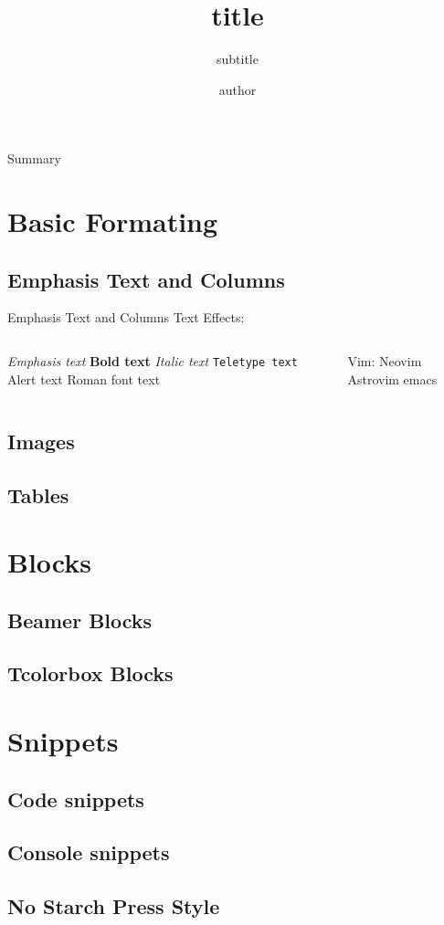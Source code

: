 \documentclass[dracula,Frankfurt,12pt]{darkbeamer}
\author{author}
\title{title}
\subtitle{subtitle}
\institute{My University}
\begin{document}
\begin{frame}{}
	\titlepage
\end{frame}

\begin{frame}{Summary}
	\tableofcontents
\end{frame}

\section{Basic Formating}
\subsection{Emphasis Text and Columns}
\begin{frame}{Emphasis Text and Columns}
	Text Effects:
	\begin{columns}[c]
		\begin{outline}
			\1 \emph{Emphasis text}
			\1 \textbf{Bold text}
			\1 \textit{Italic text}
			\1 \texttt{Teletype text}
			\1 \alert{Alert text}
			\1 \textrm{Roman font text}
		\end{outline}
		\column{.45\textwidth}
		\begin{outline}[enumerate]
			\1 Vim:
			\2 Neovim
			\2 Astrovim
			\1 emacs
		\end{outline}
	\end{columns}
\end{frame}
\subsection{Images}
\subsection{Tables}

\section{Blocks}
\subsection{Beamer Blocks}
\subsection{Tcolorbox Blocks}

\section{Snippets}
\subsection{Code snippets}
\subsection{Console snippets}
\subsection{No Starch Press Style}
\end{document}
